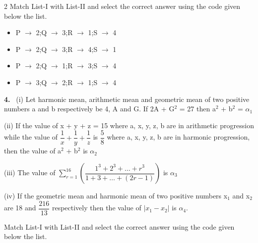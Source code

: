 \documentclass[10pt]{extarticle}
\newcommand{\qn}[1]{\par\smallskip\noindent\textbf{#1.}~}
\newenvironment{qoptions}{\begin{itemize}[leftmargin=1.8em,itemsep=1pt,topsep=2pt,label={}]}{\end{itemize}}
\newcommand{\opt}[2]{\item[(#1)] #2}
\begin{document}
\begin{multicols}{2}
Match List-I with List-II and select the correct answer using the code given below the list.\par
{}\par
\begin{qoptions}
\opt{A}{P $\to$ 2;Q $\to$ 3;R $\to$ 1;S $\to$ 4}
\opt{B}{P $\to$ 2;Q $\to$ 3;R $\to$ 4;S $\to$ 1}
\opt{C}{P $\to$ 2;Q $\to$ 1;R $\to$ 3;S $\to$ 4}
\opt{D}{P $\to$ 3;Q $\to$ 2;R $\to$ 1;S $\to$ 4}
\end{qoptions}
\qn{4} (i) Let harmonic mean, arithmetic mean and geometric mean of two positive numbers a and b respectively be 4, A and G. If 2A + G$^2$ = 27 then a$^2$ + b$^2$ = $\alpha_1$\par
(ii) If the value of x + y + z = 15 where a, x, y, z, b are in arithmetic progression while the value of $\dfrac{1}{x} + \dfrac{1}{y} + \dfrac{1}{z}$ is $\dfrac{5}{8}$ where a, x, y, z, b are in harmonic progression, then the value of a$^2$ + b$^2$ is $\alpha_2$\par
(iii) The value of $\displaystyle\sum_{r=1}^{16}\left(\dfrac{1^3 + 2^3 + \ldots + r^3}{1 + 3 + \ldots + (2r - 1)}\right)$ is $\alpha_3$\par
(iv) If the geometric mean and harmonic mean of two positive numbers x$_1$ and x$_2$ are 18 and $\dfrac{216}{13}$ respectively then the value of $|x_1 - x_2|$ is $\alpha_4$.\par
Match List-I with List-II and select the correct answer using the code given below the list.\par
{}
\end{multicols}
\end{document}
